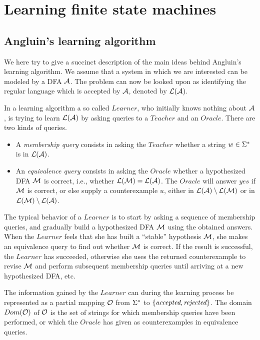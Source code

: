 \section{Learning finite state machines}

\label{sec:angluin}

\subsection{Angluin's learning algorithm}

\label{sec:angluin:direct}

We here try to give a succinct description of the main ideas behind
Angluin's learning algorithm.  We assume that a system in which we are
interested can be modeled by a DFA ${\cal A}$. The problem can now be
looked upon as identifying the regular language which is accepted by
${\cal A}$, denoted by $\mathcal{L}({\cal A})$.

In a learning algorithm a so called
$Learner$, who initially knows nothing about ${\cal A}$,
is trying to learn $\mathcal{L}({\cal A})$ by asking 
queries to a $Teacher$ and an $Oracle$.
There are two kinds of queries.
\begin{itemize}
\item A {\em membership query} consists in asking the $Teacher$ 
whether a string $w \in \Sigma^*$ is in $\mathcal{L}({\cal A})$.
\item An {\em equivalence query} consists in asking the $Oracle$ 
whether a hypothesized DFA ${\cal M}$ is correct, i.e., whether
$\mathcal{L}({\cal M}) = \mathcal{L}({\cal A})$.
The $Oracle$ will answer $yes$ if ${\cal M}$ is correct,
or else supply a counterexample
$u$, either in $\mathcal{L}({\cal A}) \setminus \mathcal{L}({\cal M})$
or in $\mathcal{L}({\cal M}) \setminus \mathcal{L}({\cal A})$.
\end{itemize}
The typical behavior of a $Learner$ is to start by asking a sequence
of membership queries, and gradually build a hypothesized DFA ${\cal M}$ using
the obtained answers. When the $Learner$ feels that she has
built a ``stable'' hypothesis ${\cal M}$, she makes
an equivalence query to find out whether ${\cal M}$ is correct.
If the result is successful, the $Learner$ has succeeded, otherwise
she uses the returned counterexample to revise ${\cal M}$ and perform
subsequent membership queries until
arriving at a new hypothesized DFA, etc.

The information gained by the $Learner$ can during the learning
process be represented as a partial mapping $\mathcal{O}$ from
$\Sigma^*$ to $\{ \mbox{\it accepted},\mbox{\it rejected} \}$.  The
domain $Dom(\mathcal{O})$ of $\mathcal{O}$ is the set of
strings for which membership queries have been performed, or which the
$Oracle$ has given as counterexamples in equivalence queries.

